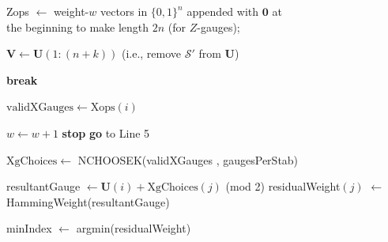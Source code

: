 \documentclass[conference]{IEEEtran}
\begin{document}
\begin{algorithm}
\begin{algorithmic}[1]
Zops $\gets$ weight-$w$ vectors in $\{0,1\}^{n}$ appended with $\boldsymbol{0}$ at\\ \hspace{1.75cm} the beginning to make length $2n$ (for $Z$-gauges); 

$\boldsymbol{V}\gets \boldsymbol{U}(1:(n+k))$ (i.e., remove $\mathcal{S}'$ from $\boldsymbol{U}$) 


  
  \State \textbf{break}
  \EndIf
  
      
   \State $\mathrm{validXGauges} \gets \mathrm{Xops}(i)$ 
  \EndIf

\EndFor

\State $w \gets w + 1$
           \State \textbf{stop}
       \Else
            \State \textbf{go} to Line 5
        \EndIf
\EndIf

\State $\mathrm{XgChoices} \gets $ NCHOOSEK(validXGauges , gaugesPerStab)

\State resultantGauge $\gets \boldsymbol{U}(i) + \mathrm{XgChoices}(j)$ (mod 2)
\State residualWeight$(j)$ $\gets$ HammingWeight(resultantGauge)
\EndFor

\State minIndex $\gets$ argmin(residualWeight)


\end{algorithmic}
\end{algorithm}
\end{document}
